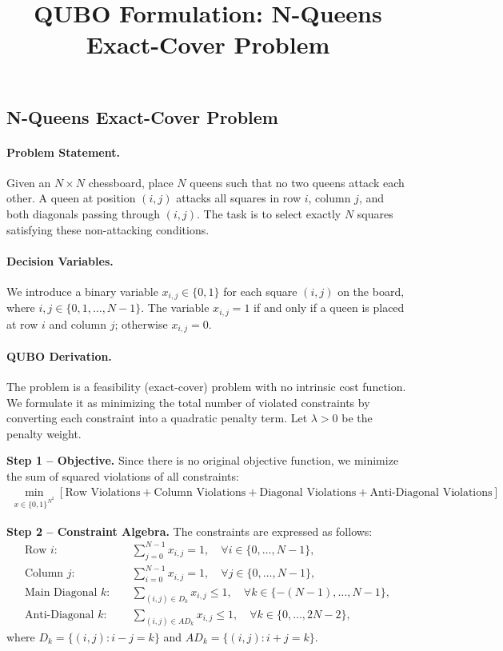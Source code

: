 \documentclass[12pt]{article}
\title{QUBO Formulation: N-Queens Exact-Cover Problem}
\date{}
\begin{document}
\maketitle

\subsection*{N-Queens Exact-Cover Problem}

\paragraph{Problem Statement.}
Given an $N \times N$ chessboard, place $N$ queens such that no two queens attack each other. A queen at position $(i,j)$ attacks all squares in row $i$, column $j$, and both diagonals passing through $(i,j)$. The task is to select exactly $N$ squares satisfying these non-attacking conditions.

\paragraph{Decision Variables.}
We introduce a binary variable $x_{i,j} \in \{0,1\}$ for each square $(i,j)$ on the board, where $i,j \in \{0,1,\dots,N-1\}$. The variable $x_{i,j} = 1$ if and only if a queen is placed at row $i$ and column $j$; otherwise $x_{i,j} = 0$.

\paragraph{QUBO Derivation.}
The problem is a feasibility (exact-cover) problem with no intrinsic cost function. We formulate it as minimizing the total number of violated constraints by converting each constraint into a quadratic penalty term. Let $\lambda > 0$ be the penalty weight.

\textbf{Step 1 -- Objective.}
Since there is no original objective function, we minimize the sum of squared violations of all constraints:
\begin{align}
\min_{x \in \{0,1\}^{N^2}} \left[ \text{Row Violations} + \text{Column Violations} + \text{Diagonal Violations} + \text{Anti-Diagonal Violations} \right].
\end{align}

\textbf{Step 2 -- Constraint Algebra.}
The constraints are expressed as follows:
\begin{align}
\text{Row } i: & \quad \sum_{j=0}^{N-1} x_{i,j} = 1, \quad \forall i \in \{0,\dots,N-1\}, \\
\text{Column } j: & \quad \sum_{i=0}^{N-1} x_{i,j} = 1, \quad \forall j \in \{0,\dots,N-1\}, \\
\text{Main Diagonal } k: & \quad \sum_{(i,j) \in D_k} x_{i,j} \le 1, \quad \forall k \in \{-(N-1),\dots,N-1\}, \\
\text{Anti-Diagonal } k: & \quad \sum_{(i,j) \in AD_k} x_{i,j} \le 1, \quad \forall k \in \{0,\dots,2N-2\},
\end{align}
where $D_k = \{(i,j) : i-j=k\}$ and $AD_k = \{(i,j) : i+j=k\}$.
\end{document}
